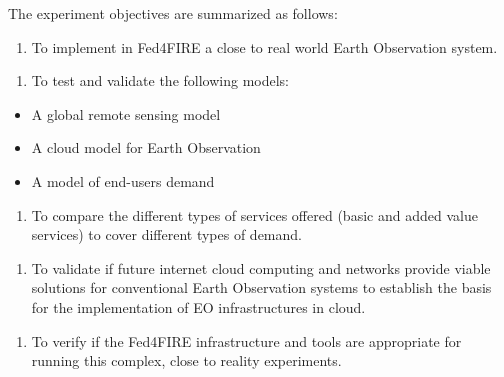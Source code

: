 \documentclass[a4paper]{article}
\newcounter{saveenum}
\newcommand\liststyleLFOxlix{%
\renewcommand\theenumi{\arabic{enumi}}
\renewcommand\theenumii{\alph{enumii}}
\renewcommand\theenumiii{\roman{enumiii}}
\renewcommand\theenumiv{\arabic{enumiv}}
\renewcommand\labelenumi{\theenumi.}
\renewcommand\labelenumii{\theenumii.}
\renewcommand\labelenumiii{\theenumiii.}
\renewcommand\labelenumiv{\theenumiv.}
}
\newcommand\liststyleLFOxxxvii{%
\renewcommand\labelitemi{[F0B7?]}
\renewcommand\labelitemii{o}
\renewcommand\labelitemiii{[F0A7?]}
\renewcommand\labelitemiv{[F0B7?]}
}
\begin{document}
The experiment objectives are summarized as follows:


\bigskip

\liststyleLFOxlix
\setcounter{saveenum}{\value{enumi}}
\begin{enumerate}
\setcounter{enumi}{\value{saveenum}}
\item To implement in Fed4FIRE a close to real world Earth Observation
system.
\end{enumerate}

\bigskip

\liststyleLFOxlix
\setcounter{saveenum}{\value{enumi}}
\begin{enumerate}
\setcounter{enumi}{\value{saveenum}}
\item To test and validate the following models:
\end{enumerate}
\liststyleLFOxxxvii
\begin{itemize}
\item A global remote sensing model
\item A cloud model for Earth Observation
\item A model of end-users demand\ 
\end{itemize}

\bigskip

\liststyleLFOxlix
\setcounter{saveenum}{\value{enumi}}
\begin{enumerate}
\setcounter{enumi}{\value{saveenum}}
\item To compare the different types of services offered (basic and
added value services) to cover different types of demand.\ 
\end{enumerate}

\bigskip

\liststyleLFOxlix
\setcounter{saveenum}{\value{enumi}}
\begin{enumerate}
\setcounter{enumi}{\value{saveenum}}
\item To validate if future internet cloud computing and networks
provide viable solutions for conventional Earth Observation systems to
establish the basis for the implementation of EO infrastructures in
cloud.\ 
\end{enumerate}

\bigskip

\liststyleLFOxlix
\setcounter{saveenum}{\value{enumi}}
\begin{enumerate}
\setcounter{enumi}{\value{saveenum}}
\item To verify if the Fed4FIRE infrastructure and tools are appropriate
for running this complex, close to reality experiments.
\end{enumerate}
\end{document}
